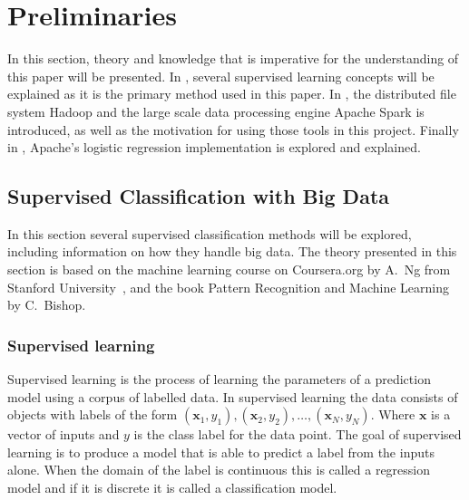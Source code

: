 \section{Preliminaries}\label{sec:prelim}
In this section, theory and knowledge that is imperative for the understanding of this paper will be presented. In , several supervised learning concepts will be explained as it is the primary method used in this paper. In , the distributed file system Hadoop and the large scale data processing engine Apache Spark is introduced, as well as the motivation for using those tools in this project. Finally in , Apache's logistic regression implementation is explored and explained. 

\subsection{Supervised Classification with Big Data}\label{sec:supervisedclassification}
In this section several supervised classification methods will be explored, including information on how they handle big data.
The theory presented in this section is based on the machine learning course on Coursera.org by A.\ Ng from Stanford University~\cite{courseraAI}, and the book Pattern Recognition and Machine Learning by C.\ Bishop\cite{Bishop2006}.


\subsubsection{Supervised learning}
Supervised learning is the process of learning the parameters of a prediction model using a corpus of labelled data.
In supervised learning the data consists of objects with labels of the form 
$(\mathbf{x}_1,y_1),(\mathbf{x}_2,y_2), \dots, (\mathbf{x}_N,y_N)$.
Where $\mathbf{x}$ is a vector of inputs and $y$ is the class label for the data point.
The goal of supervised learning is to produce a model that is able to predict a label from the inputs alone.
When the domain of the label is continuous this is called a regression model and if it is discrete it is called a classification model.

